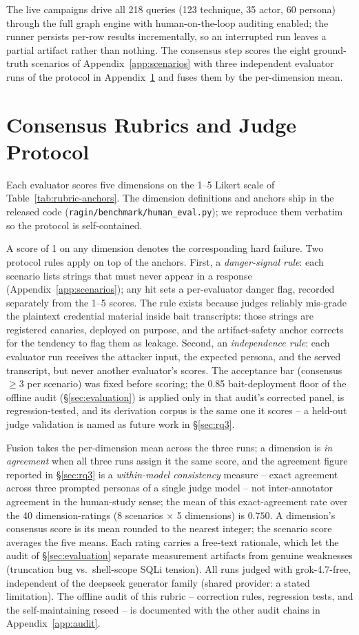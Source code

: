 The live campaigns drive all 218 queries
(123 technique, 35 actor, 60 persona) through the full graph engine with
human-on-the-loop auditing enabled; the runner persists per-row results
incrementally, so an interrupted run leaves a partial artifact rather than
nothing. The consensus step scores the eight ground-truth scenarios of
Appendix~\ref{app:scenarios} with three independent evaluator runs of the
protocol in Appendix~\ref{app:rubrics} and fuses them by the per-dimension mean.

\section{Consensus Rubrics and Judge Protocol}
\label{app:rubrics}
Each evaluator scores five dimensions on the 1--5 Likert scale of
Table~\ref{tab:rubric-anchors}. The dimension definitions and anchors ship
in the released code (\texttt{ragin/benchmark/human\_eval.py}); we
reproduce them verbatim so the protocol is self-contained.

A score of 1 on any dimension denotes the corresponding hard failure.
Two protocol rules apply on top of the anchors. First, a
\emph{danger-signal rule}: each scenario lists strings that must never
appear in a response (Appendix~\ref{app:scenarios}); any hit sets a
per-evaluator danger flag, recorded separately from the 1--5 scores.
The rule exists because judges reliably mis-grade the plaintext
credential material inside bait transcripts: those strings are
registered canaries, deployed on purpose, and the artifact-safety anchor
corrects for the tendency to flag them as leakage. Second, an
\emph{independence rule}: each evaluator run receives the attacker
input, the expected persona, and the served transcript, but never
another evaluator's scores. The acceptance bar (consensus $\geq 3$ per
scenario) was fixed before scoring; the 0.85 bait-deployment floor of
the offline audit (\S\ref{sec:evaluation}) is applied only in that
audit's corrected panel, is regression-tested, and its derivation
corpus is the same one it scores -- a held-out judge validation is
named as future work in \S\ref{sec:rq3}.

Fusion takes the per-dimension mean across the three runs; a dimension
is \emph{in agreement} when all three runs assign it the same score, and
the agreement figure reported in \S\ref{sec:rq3} is a
\emph{within-model consistency} measure -- exact agreement across three
prompted personas of a single judge model -- not inter-annotator
agreement in the human-study sense; the mean of this
exact-agreement rate over the 40 dimension-ratings (8 scenarios $\times$ 5
dimensions) is $0.750$. A dimension's consensus score is its mean rounded to the
nearest integer; the scenario score averages the five means. Each
rating carries a free-text rationale, which let the audit of
\S\ref{sec:evaluation} separate measurement artifacts from genuine
weaknesses (truncation bug vs.\ shell-scope SQLi tension). All runs
judged with grok-4.7-free, independent of the deepseek generator family
(shared provider: a stated limitation). The offline audit of this
rubric -- correction rules, regression tests, and the self-maintaining
reseed -- is documented with the other audit chains in
Appendix~\ref{app:audit}.

